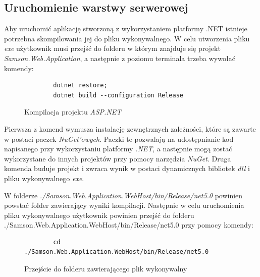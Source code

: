 \documentclass[a4paper,twoside,12pt]{book}
\begin{document}
\subsection{Uruchomienie warstwy serwerowej}
Aby uruchomić aplikację stworzoną z wykorzystaniem platformy .NET istnieje potrzebna skompilowania jej do pliku wykonywalnego. W celu utworzenia pliku \textit{exe} użytkownik musi przejść do folderu w którym znajduje się projekt \textit{Samson.Web.Application}, a następnie z poziomu terminala trzeba wywołać komendy:
\begin{figure} [H]
	\centering
	\begin{lstlisting}
		dotnet restore;
		dotnet build --configuration Release
	\end{lstlisting}
	\caption{Kompilacja projektu \textit{ASP.NET}}
	\label{fig:dotnetCompilation}
\end{figure}
Pierwsza z komend wymusza instalację zewnętrznych zależności, które są zawarte w postaci paczek \textit{NuGet'owych}. Paczki te pozwalają na udostępnianie kod napisanego przy wykorzystaniu platformy \textit{.NET}, a następnie mogą zostać wykorzystane do innych projektów przy pomocy narzędzia \textit{NuGet}. Druga komenda buduje projekt i zwraca wynik w postaci dynamicznych bibliotek \textit{dll} i pliku wykonywalnego \textit{exe}.

W folderze \textit{./Samson.Web.Application.WebHost/bin/Release/net5.0} powinien powstać folder zawierający wyniki kompilacji. Następnie w celu uruchomienia pliku wykonywalnego użytkownik powinien przejść do folderu ./Samson.Web.Application.WebHost/bin/Release/net5.0 przy pomocy komendy:
\begin{figure} [H]
	\centering
	\begin{lstlisting}
		cd ./Samson.Web.Application.WebHost/bin/Release/net5.0
	\end{lstlisting}
	\caption{Przejście do folderu zawierającego plik wykonywalny}
	\label{fig:aspnetChangeFolder}
\end{figure}
\end{document}
